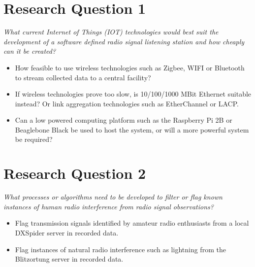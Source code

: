 \documentclass[runningheads,a4paper]{llncs}
\begin{document}




%
%
\newpage
\chapter*{Research Question 1}

\textit{What current Internet of Things (\gls{IOT}) technologies would best suit the development of a software defined radio signal listening station and how cheaply can it be created?}

\begin{itemize}
  	\item How feasible to use wireless technologies such as Zigbee, WIFI or Bluetooth to stream collected data to a central facility?
  	\item If wireless technologies prove too slow, is 10/100/1000 MBit Ethernet suitable instead? Or link aggregation technologies such as EtherChannel or LACP.
  	\item Can a low powered computing platform such as the Raspberry Pi 2B or Beaglebone Black be used to host the system, or will a more powerful system be required?
\end{itemize}


%
%
\newpage
\chapter*{Research Question 2}

\textit{What processes or algorithms need to be developed to filter or flag known instances of human radio interference from radio signal observations?}

\begin{itemize}
	\item Flag transmission signals identified by amateur radio enthusiasts from a local DXSpider server in recorded data.
  	\item Flag instances of natural radio interference such as lightning from the Blitzortung server in recorded data.
\end{itemize}
\end{document}
